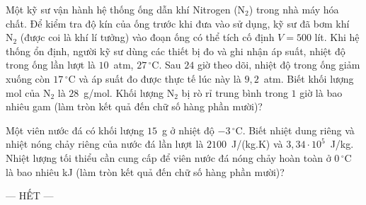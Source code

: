 	\begin{ex}%
		Một kỹ sư vận hành hệ thống ống dẫn khí Nitrogen ($\text{N}_2$) trong nhà máy hóa chất. Để kiểm tra độ kín của ống trước khi đưa vào sử dụng, kỹ sư đã bơm khí $\text{N}_2$ (được coi là khí lí tưởng) vào đoạn ống có thể tích cố định $V=500$ lít. Khi hệ thống ổn định, người kỹ sư dùng các thiết bị đo và ghi nhận áp suất, nhiệt độ trong ống lần lượt là $10$~atm, $27\,^\circ\text{C}$. Sau $24$ giờ theo dõi, nhiệt độ trong ống giảm xuống còn $17\,^\circ\text{C}$ và áp suất đo được thực tế lúc này là $9{,}2$~atm. Biết khối lượng mol của $\text{N}_2$ là $28$~g/mol. Khối lượng $\text{N}_2$ bị rò rỉ trung bình trong $1$ giờ là bao nhiêu gam (làm tròn kết quả đến chữ số hàng phần mười)?
		\par
	\end{ex}

	\begin{ex}%
		Một viên nước đá có khối lượng $15$~g ở nhiệt độ $-3\,^\circ\text{C}$. Biết nhiệt dung riêng và nhiệt nóng chảy riêng của nước đá lần lượt là $2100$~J/(kg.K) và $3{,}34\cdot 10^5$~J/kg. Nhiệt lượng tối thiểu cần cung cấp để viên nước đá nóng chảy hoàn toàn ở $0\,^\circ\text{C}$ là bao nhiêu kJ (làm tròn kết quả đến chữ số hàng phần mười)?
		\par
	\end{ex}

	\centerline{--- HẾT ---}


